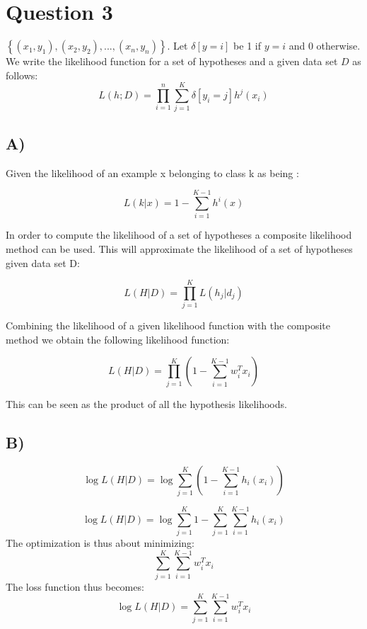 \documentclass{report}
\begin{document}
\section*{Question 3}


$\left\{ (x_1,y_1),(x_2,y_2),...,(x_n,y_n)\right\}$.
Let $\delta[y=i]$ be 1 if $y=i$ and 0 otherwise. We write the likelihood function for a set of hypotheses and a given data set $D$ as follows:
$$L(h;D)=\prod_{i=1}^{n}\sum_{j=1}^{K}\delta[y_i=j]h^j(x_i)$$

\subsection*{A)}
Given the likelihood of an example x belonging to class k as being :

\begin{equation}
  L(k | x) = 1 - \sum_{i=1}^{K-1}h^i(x)
\end{equation}

In order to compute the likelihood of a set of hypotheses a composite likelihood
method can be used. This will approximate the likelihood of a set
of hypotheses given data set D:

\begin{equation}
  L(H | D) = \prod_{j=1}^K  L(h_j | d_j)
\end{equation}

Combining the likelihood of a given likelihood function with the composite method
we obtain the following likelihood function:

\begin{equation}
  L(H | D) = \prod_{j=1}^K
  \left(
  1 - \sum_{i=1}^{K-1}w_i^T x_i
  \right)
\end{equation}

This can be seen as the product of all the hypothesis likelihoods.

\subsection*{B)}
\begin{equation}
  \log L(H | D) = \log \sum_{j=1}^K
  \left(
  1 - \sum_{i=1}^{K-1}h_i(x_i)
  \right)
\end{equation}

\begin{equation}
  \log L(H | D) = \log
  \sum_{j=1}^K
  1 - \sum_{j=1}^K \sum_{i=1}^{K-1}h_i(x_i)
\end{equation}
The optimization is thus about minimizing:
\begin{equation}
  \sum_{j=1}^K \sum_{i=1}^{K-1}w_i^T x_i
\end{equation}
The loss function thus becomes:
\begin{equation}
  \log L(H | D) = \sum_{j=1}^K \sum_{i=1}^{K-1}w_i^T x_i
\end{equation}
\end{document}
